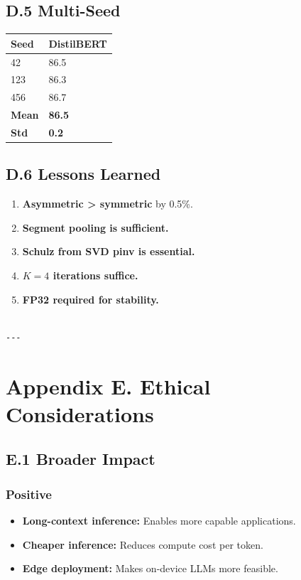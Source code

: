 \subsection{D.5 Multi-Seed}

\begin{table}[H]
\centering
\small
\begin{tabular}{ll}
\toprule
\textbf{Seed} & \textbf{DistilBERT} \\
\midrule
42 & 86.5 \\
123 & 86.3 \\
456 & 86.7 \\
\textbf{Mean} & \textbf{86.5} \\
\textbf{Std} & \textbf{0.2} \\
\bottomrule
\end{tabular}
\end{table}

\subsection{D.6 Lessons Learned}

\begin{enumerate}
\item \textbf{Asymmetric > symmetric} by 0.5\%.
\item \textbf{Segment pooling is sufficient.}
\item \textbf{Schulz from SVD pinv is essential.}
\item \textbf{$K = 4$ iterations suffice.}
\item \textbf{FP32 required for stability.}
\end{enumerate}
\begin{lstlisting}

---
\end{lstlisting}


\section{Appendix E. Ethical Considerations}

\subsection{E.1 Broader Impact}

\subsubsection{Positive}
\begin{itemize}
\item \textbf{Long-context inference:} Enables more capable applications.
\item \textbf{Cheaper inference:} Reduces compute cost per token.
\item \textbf{Edge deployment:} Makes on-device LLMs more feasible.

\end{itemize}
